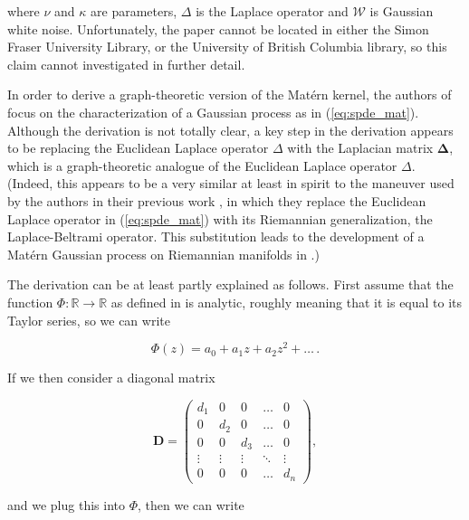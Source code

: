 where $\nu$ and $\kappa$ are parameters, $\Delta$ is the Laplace operator and $\mathcal W$ is Gaussian white noise. Unfortunately, the paper \cite{whittle1963stochastic} cannot be located in either the Simon Fraser University Library, or the University of British Columbia library, so this claim cannot investigated in further detail.

In order to derive a graph-theoretic version of the Mat\'{e}rn kernel, the authors of \cite{pmlr-v130-borovitskiy21a} focus on the characterization of a Gaussian process as in (\ref{eq:spde_mat}). Although the derivation is not totally clear, a key step in the derivation appears to be replacing the Euclidean Laplace operator $\Delta$ with the Laplacian matrix $\bm \Delta$, which is a graph-theoretic analogue of the Euclidean Laplace operator $\Delta$. (Indeed, this appears to be a very similar at least in spirit to the maneuver used by the authors in their previous work \cite{NEURIPS2020_92bf5e62}, in which they replace the Euclidean Laplace operator in (\ref{eq:spde_mat}) with its Riemannian generalization, the Laplace-Beltrami operator. This substitution leads to the development of a Mat\'{e}rn Gaussian process on Riemannian manifolds in \cite{NEURIPS2020_92bf5e62}.)

The derivation can be at least partly explained as follows. First assume that the function $\Phi \colon \mathbb R \to \mathbb R$ as defined in \cite{pmlr-v130-borovitskiy21a} is analytic, roughly meaning that it is equal to its Taylor series, so we can write

\begin{equation}\label{eq:phi_1}
    \Phi(z) = a_0 + a_1 z + a_2 z^2 + \dots \, .
\end{equation}

If we then consider a diagonal matrix

\[
    \mathbf D = 
    \begin{pmatrix}
        d_1 & 0 & 0 & \ldots & 0 \\
        0 & d_2 & 0 & \ldots & 0 \\
        0 & 0 & d_3 & \ldots & 0 \\
        \vdots & \vdots & \vdots & \ddots & \vdots \\
        0 & 0 & 0 & \ldots & d_n
    \end{pmatrix},
\]

and we plug this into $\Phi$, then we can write

